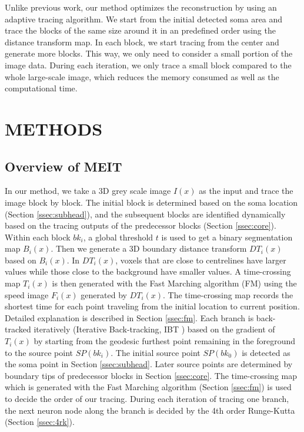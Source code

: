 \documentclass[conference]{IEEEtran}
\begin{document}
Unlike previous work, our method optimizes the reconstruction by using an adaptive tracing algorithm. We start from the initial detected soma area and trace the blocks of the same size around it in an predefined order using the distance transform map. In each block, we start tracing from the center and generate more blocks. This way, we only need to consider a small portion of the image data. During each iteration, we only trace a small block compared to the whole large-scale image, which reduces the memory consumed as well as the computational time.



\section{METHODS}
\label{sec:format}



\subsection{Overview of MEIT}
\label{ssec:overview}
In our method, we take a 3D grey scale image $I(x)$ as the input and trace the image block by block. The initial block is determined based on the soma location (Section \ref{ssec:subhead}), and the subsequent blocks are identified dynamically based on the tracing outputs of the predecessor blocks (Section \ref{ssec:core}). Within each block $bk_i$, a global threshold $t$ is used to get a binary segmentation map $B_i(x)$. Then we generate a 3D boundary distance transform $DT_i(x)$ based on $B_i(x)$. In $DT_i(x)$, voxels that are close to centrelines have larger values while those close to the background have smaller values. A time-crossing map $T_i(x)$ is then generated with the Fast Marching algorithm (FM) \cite{fm-sethian, r1_2} using the speed image $F_i(x)$ generated by $DT_i(x)$. The time-crossing map records the shortest time for each point traveling from the initial location to current position. Detailed explanation is described in Section \ref{ssec:fm}. Each branch is back-tracked iteratively (Iterative Back-tracking, IBT \cite{r2}) based on the gradient of $T_i(x)$ by starting from the geodesic furthest point remaining in the foreground to the source point $SP(bk_i)$. The initial source point $SP(bk_0)$ is detected as the soma point in Section \ref{ssec:subhead}. Later source points are determined by boundary tips of predecessor blocks in Section \ref{ssec:core}. The time-crossing map which is generated with the Fast Marching algorithm (Section \ref{ssec:fm}) is used to decide the order of our tracing. During each iteration of tracing one branch, the next neuron node along the branch is decided by the 4th order Runge-Kutta (Section \ref{ssec:4rk}).
\end{document}
